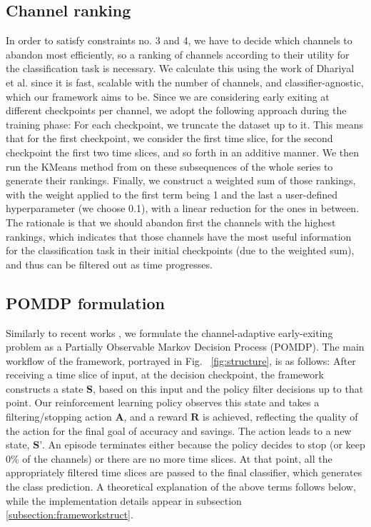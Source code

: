 \documentclass[conference]{IEEEtran}
\begin{document}
\subsection{Channel ranking}\label{subsection:ordering}
In order to satisfy constraints no. 3 and 4, we have to decide which channels to abandon most efficiently, so a ranking of channels according to their utility for the classification task is necessary. We calculate this using the work of Dhariyal et al.\cite{dhariyal2021fast} since it is fast, scalable with the number of channels, and classifier-agnostic, which our framework aims to be. Since we are considering early exiting at different checkpoints per channel, we adopt the following approach during the training phase: For each checkpoint, we truncate the dataset up to it. This means that for the first checkpoint, we consider the first time slice, for the second checkpoint the first two time slices, and so forth in an additive manner. 
We then run the KMeans method from \cite{dhariyal2021fast} on these subsequences of the whole series to generate their rankings. 
Finally, we construct a weighted sum of those rankings, with the weight applied to the first term being 1 and the last a user-defined hyperparameter (we choose 0.1), with a linear reduction for the ones in between. The rationale is that we should abandon first the channels with the highest rankings, which indicates that those channels have the most useful information for the classification task in their initial checkpoints (due to the weighted sum), and thus can be filtered out as time progresses.

\subsection{POMDP formulation}
Similarly to recent works \cite{martinez2020adaptive,hartvigsen2020recurrent,hartvigsen2022stop}, we formulate the channel-adaptive early-exiting problem as a Partially Observable Markov Decision Process (POMDP). The main workflow of the framework, portrayed in Fig. ~\ref{fig:structure}, is as follows: After receiving a time slice of input, at the decision checkpoint, the framework constructs a state $\textbf{S}$, based on this input and the policy filter decisions up to that point. Our reinforcement learning policy observes this state and takes a filtering/stopping action $\textbf{A}$, and a reward $\textbf{R}$ is achieved, reflecting the quality of the action for the final goal of accuracy and savings. The action leads to a new state, $\textbf{S'}$. An episode terminates either because the policy decides to stop (or keep 0\% of the channels) or there are no more time slices. At that point, all the appropriately filtered time slices are passed to the final classifier, which generates the class prediction. A theoretical explanation of the above terms follows below, while the implementation details appear in subsection \ref{subsection:frameworkstruct}.
\end{document}
